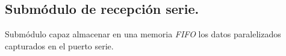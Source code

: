 \subsection{Submódulo de recepción serie.}
Submódulo capaz almacenar en una memoria \emph{FIFO} los datos paralelizados capturados en el puerto serie.





